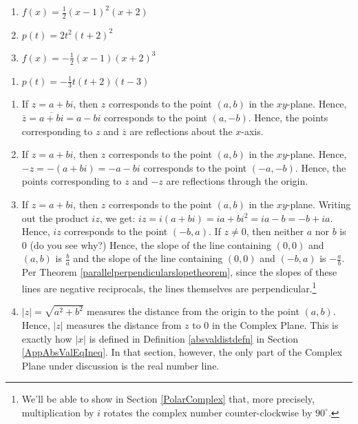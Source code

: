 \begin{multicols}{3}
\begin{enumerate}
\setcounter{enumi}{\value{HW}}


\item $f(x) =\frac{1}{2} (x-1)^2 (x+2)$
\item $p(t) =2 t^2 (t+2)^2$
\item $f(x) =-\frac{1}{2} (x-1) (x+2)^3$


\setcounter{HW}{\value{enumi}}
\end{enumerate}
\end{multicols}

\begin{enumerate}
\setcounter{enumi}{\value{HW}}

\item $p(t) = -\frac{1}{3} t(t+2)(t-3)$

\setcounter{HW}{\value{enumi}}
\end{enumerate}

\begin{enumerate}
\setcounter{enumi}{\value{HW}}

\item If $z = a+bi$, then $z$ corresponds to the point $(a,b)$ in the $xy$-plane.  Hence, $\overline{z} = \overline{a+bi} = a-bi$ corresponds to the point $(a,-b)$.  Hence, the points corresponding to $z$ and $\overline{z}$ are reflections about the $x$-axis.

\item    If $z = a+bi$, then $z$ corresponds to the point $(a,b)$ in the $xy$-plane.  Hence, $-z =-(a+bi) = -a-bi$ corresponds to the point $(-a,-b)$.  Hence, the points corresponding to $z$ and $-z$ are reflections through the origin.

\item  If $z = a+bi$, then $z$ corresponds to the point $(a,b)$ in the $xy$-plane.  Writing out the product $iz$, we get: $iz =i(a+bi) = ia+bi^2 = ia - b = -b+ia$.  Hence, $iz$ corresponds to the point $(-b,a)$.  If $z \neq 0$, then neither $a$ nor $b$ is $0$ (do you see why?) Hence, the slope of the line containing $(0,0)$ and $(a,b)$ is $\frac{b}{a}$ and the slope of the line containing $(0,0)$ and $(-b,a)$ is $-\frac{a}{b}$.  Per Theorem \ref{parallelperpendicularslopetheorem}, since the slopes of these lines are negative reciprocals, the lines themselves are perpendicular.\footnote{We'll be able to show in Section \ref{PolarComplex}  that, more precisely, multiplication by $i$ rotates the complex number counter-clockwise by $90^{\circ}$.}

\item $|z| = \sqrt{a^2+b^2}$ measures the distance from the origin to the point $(a,b)$.  Hence, $|z|$ measures the distance from $z$ to $0$ in the Complex Plane.  This is exactly how $|x|$ is defined in Definition \ref{absvaldistdefn} in Section \ref{AppAbsValEqIneq}.  In that section, however,  the only part of the Complex Plane under discussion is the real number line.

\setcounter{HW}{\value{enumi}}
\end{enumerate}


